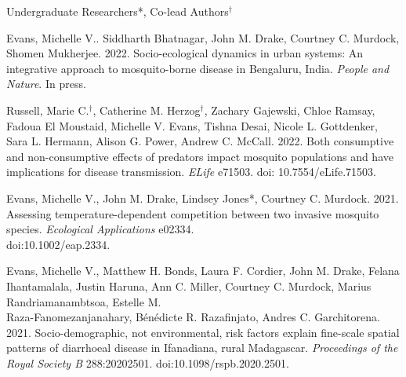 


\bigskip
Undergraduate Researchers*, Co-lead Authors$^\dagger$

\smallskip

\begin{etaremune}

\item \textcolor{awesome}{Evans, Michelle V.}. Siddharth Bhatnagar, John M. Drake, Courtney C. Murdock, Shomen Mukherjee. 2022. Socio-ecological dynamics in urban systems: An integrative approach to mosquito-borne disease in Bengaluru, India. \textit{People and Nature}. In press. \smallskip

\item Russell, Marie C.$^\dagger$, Catherine M. Herzog$^\dagger$, Zachary Gajewski, Chloe Ramsay, Fadoua El Moustaid, \textcolor{awesome}{Michelle V. Evans}, Tishna Desai, Nicole L. Gottdenker, Sara L. Hermann, Alison G. Power, Andrew C. McCall. 2022. Both consumptive and non-consumptive effects of predators impact mosquito populations and have implications for disease transmission. \textit{ELife} e71503. doi: 10.7554/eLife.71503. \smallskip

\item \textcolor{awesome}{Evans, Michelle V.}, John M. Drake, Lindsey Jones*, Courtney C. Murdock. 2021. Assessing temperature-dependent competition between two invasive mosquito species. \textit{Ecological Applications} e02334. \\ doi:10.1002/eap.2334. \smallskip

\item \textcolor{awesome}{Evans, Michelle V.}, Matthew H. Bonds, Laura F. Cordier, John M. Drake, Felana Ihantamalala, Justin Haruna, Ann C. Miller, Courtney C. Murdock, Marius Randriamanambtsoa, Estelle M. \\ Raza-Fanomezanjanahary, Bénédicte R. Razafinjato, Andres C. Garchitorena. 2021. Socio-demographic, not environmental, risk factors explain fine-scale spatial patterns of diarrhoeal disease in Ifanadiana, rural Madagascar. \textit{Proceedings of the Royal Society B} 288:20202501. doi:10.1098/rspb.2020.2501. \smallskip


\end{etaremune}

